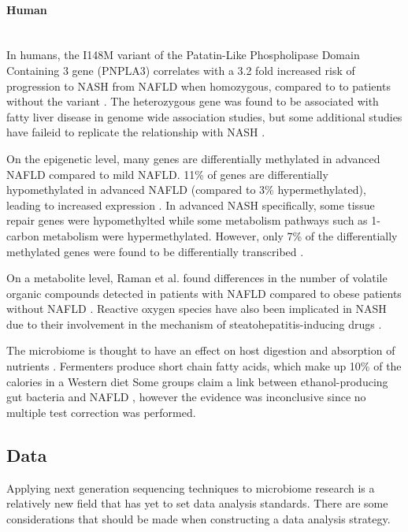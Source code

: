 \paragraph{Human}\mbox{}\\
In humans, the I148M variant of the Patatin-Like Phospholipase Domain Containing 3 gene (PNPLA3) correlates with a 3.2 fold increased risk of progression to NASH from NAFLD when homozygous, compared to to patients without the variant \cite{sookoian2011meta}. The heterozygous gene was found to be associated with fatty liver disease in genome wide association studies, but some additional studies have faileid to replicate the relationship with NASH \cite{sookoian2011meta}.

On the epigenetic level, many genes are differentially methylated in advanced NAFLD compared to mild NAFLD. 11\% of genes are differentially hypomethylated in advanced NAFLD (compared to 3\% hypermethylated), leading to increased expression \cite{murphy2013relationship}. In advanced NASH specifically, some tissue repair genes were hypomethylted while some metabolism pathways such as 1-carbon metabolism were hypermethylated. However, only 7\% of the differentially methylated genes were found to be differentially transcribed \cite{murphy2013relationship}.

On a metabolite level, Raman et al. found differences in the number of volatile organic compounds detected in patients with NAFLD compared to obese patients without NAFLD \cite{raman2013fecal}. Reactive oxygen species have also been implicated in NASH due to their involvement in the mechanism of steatohepatitis-inducing drugs \cite{berson1998steatohepatitis}.

 The microbiome is thought to have an effect on host digestion and absorption of nutrients \cite{gill2006metagenomic}. Fermenters produce short chain fatty acids, which make up 10\% of the calories in a Western diet \cite{mcneil1984contribution} Some groups claim a link between ethanol-producing gut bacteria and NAFLD \cite{zhu2013characterization} \cite{jiang2015dysbiosis}, however the evidence was inconclusive since no multiple test correction was performed.

\subsection{Data}
Applying next generation sequencing techniques to microbiome research is a relatively new field that has yet to set data analysis standards. There are some considerations that should be made when constructing a data analysis strategy.

